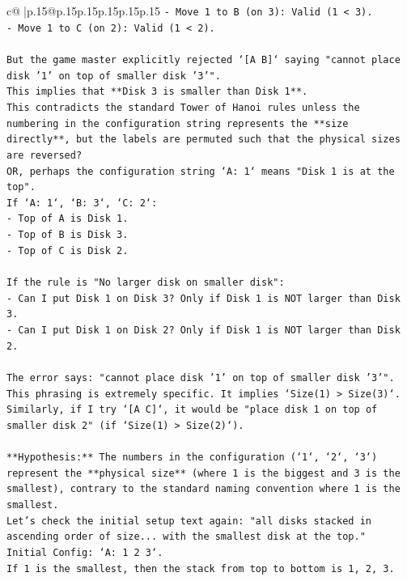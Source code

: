 \documentclass{article}
\begin{document}
{\begin{supertabular}{c@{$\;$}|p{.15\linewidth}@{}p{.15\linewidth}p{.15\linewidth}p{.15\linewidth}p{.15\linewidth}p{.15\linewidth}}
{{{\texttt{{-} Move 1 to B (on 3): Valid (1 < 3).} \\
\texttt{{-} Move 1 to C (on 2): Valid (1 < 2).} \\
\\ 
\texttt{But the game master explicitly rejected `{[}A B{]}` saying "cannot place disk '1' on top of smaller disk '3'".} \\
\texttt{This implies that **Disk 3 is smaller than Disk 1**.} \\
\texttt{This contradicts the standard Tower of Hanoi rules unless the numbering in the configuration string represents the **size directly**, but the labels are permuted such that the physical sizes are reversed?} \\
\texttt{OR, perhaps the configuration string `A: 1` means "Disk 1 is at the top".} \\
\texttt{If `A: 1`, `B: 3`, `C: 2`:} \\
\texttt{{-} Top of A is Disk 1.} \\
\texttt{{-} Top of B is Disk 3.} \\
\texttt{{-} Top of C is Disk 2.} \\
\\ 
\texttt{If the rule is "No larger disk on smaller disk":} \\
\texttt{{-} Can I put Disk 1 on Disk 3? Only if Disk 1 is NOT larger than Disk 3.} \\
\texttt{{-} Can I put Disk 1 on Disk 2? Only if Disk 1 is NOT larger than Disk 2.} \\
\\ 
\texttt{The error says: "cannot place disk '1' on top of smaller disk '3'".} \\
\texttt{This phrasing is extremely specific. It implies `Size(1) > Size(3)`.} \\
\texttt{Similarly, if I try `{[}A C{]}`, it would be "place disk 1 on top of smaller disk 2" (if `Size(1) > Size(2)`).} \\
\\ 
\texttt{**Hypothesis:** The numbers in the configuration (`1`, `2`, `3`) represent the **physical size** (where 1 is the biggest and 3 is the smallest), contrary to the standard naming convention where 1 is the smallest.} \\
\texttt{Let's check the initial setup text again: "all disks stacked in ascending order of size... with the smallest disk at the top."} \\
\texttt{Initial Config: `A: 1 2 3`.} \\
\texttt{If 1 is the smallest, then the stack from top to bottom is 1, 2, 3.} \\
}}}
\end{supertabular}}
\end{document}
